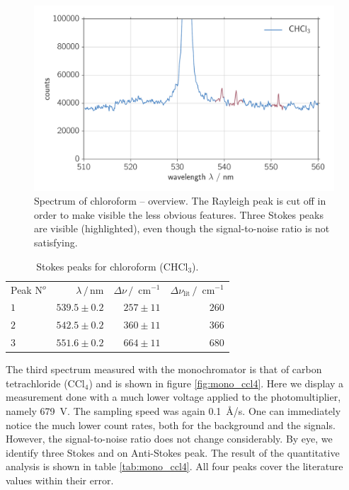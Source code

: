 \begin{figure}[htpb]
    \centering
    \includegraphics[width=0.8\linewidth]{analysis/figures/mono_chcl3}
    \caption{Spectrum of chloroform -- overview. The Rayleigh peak is cut off in order to make visible the less obvious 
    features. Three Stokes peaks are visible (highlighted), even though the signal-to-noise ratio is not satisfying.}
    \label{fig:mono_chcl3}
\end{figure}

\begin{table}[htpb]
    \centering
    \caption{
        Stokes peaks for chloroform (CHCl$_3$). 
        }
    \label{tab:mono_chcl3}
    \begin{tabular}{l r r r}
        \rowcolor{LightCyan} Peak N$^o$ & $\lambda \, / \, \text{nm}$ &
        $\Delta \nu \, / \, \text{ cm}^{-1}$ & 
        $\Delta \nu_\text{lit} \, / \, \text{ cm}^{-1}$ \\
        \cellcolor{LightCyan}$1$ & $539.5 \pm 0.2$ & $257 \pm 11$ & $260$   \\
        \cellcolor{LightCyan}$2$ & $542.5 \pm 0.2$ & $360 \pm 11$ & $366$   \\
        \cellcolor{LightCyan}$3$ & $551.6 \pm 0.2$ & $664 \pm 11$ & $680$  
    \end{tabular}
\end{table}

The third spectrum measured with the monochromator is that of carbon tetrachloride (CCl$_4$) and is shown in figure 
\ref{fig:mono_ccl4}. Here we display a measurement done with a much lower voltage applied to the photomultiplier, 
namely 679~V. The sampling speed was again 0.1~\AA/s. One can immediately notice the much lower count rates, both for 
the background and the signals. However, the signal-to-noise ratio does not change considerably. By eye, we identify 
three Stokes and on Anti-Stokes peak. The result of the quantitative analysis is shown in table \ref{tab:mono_ccl4}. 
All four peaks cover the literature values within their error.

